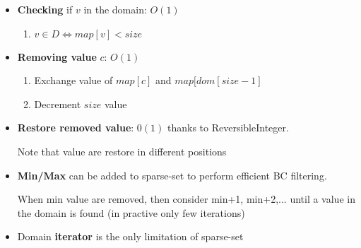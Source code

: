 \begin{itemize}
    \item \textbf{Checking} if $v$ in the domain: $O(1)$
        \begin{enumerate}
        \item $v \in D \Leftrightarrow map[v] < size$
            \end{enumerate}

    \item \textbf{Removing value} $c$: $O(1)$
        \begin{enumerate}
        \item Exchange value of $map[c]$  and  $map[dom[size-1]$
                \item Decrement $size$ value
            \end{enumerate}

        \item \textbf{Restore removed value}: $0(1)$ thanks to
            ReversibleInteger.

            Note that value are restore in different positions

    \item \textbf{Min/Max} can be added to sparse-set to perform
        efficient BC filtering. 

        When min value are removed, then consider min+1, min+2,...
        until a value in the domain is found (in practive only few
        iterations)

    \item Domain \textbf{iterator} is the only limitation of sparse-set
\end{itemize}





